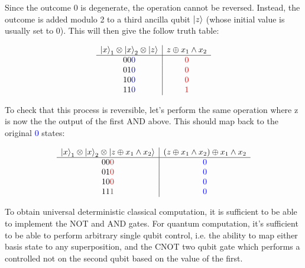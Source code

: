 Since the outcome 0 is degenerate, the operation cannot be reversed. Instead, the outcome is added modulo 2 to a third ancilla qubit $\left\vert{z}\right\rangle$ (whose initial value is usually set to 0). This will then give the follow truth table:

\begin{equation}
\begin{array}{c|c}
    \left\vert{x}\right\rangle_1 \otimes \left\vert{x}\right\rangle_2 \otimes \left\vert{z}\right\rangle & z \oplus x_1\wedge x_2 \\
    \hline
    00\textcolor{blue}{0} & \textcolor{red}{0} \\
    01\textcolor{blue}{0} & \textcolor{red}{0} \\
    10\textcolor{blue}{0} & \textcolor{red}{0} \\
    11\textcolor{blue}{0} & \textcolor{red}{1} \\
\end{array}
\end{equation}

To check that this process is reversible, let's perform the same operation where z is now the the output of the first AND above. This should map back to the original \textcolor{blue}{0} states:

\begin{equation}
\begin{array}{c|c}
    \left\vert{x}\right\rangle_1 \otimes \left\vert{x}\right\rangle_2 \otimes \left\vert{z \oplus x_1\wedge x_2}\right\rangle & (z \oplus x_1\wedge x_2) \oplus x_1\wedge x_2 \\
    \hline
    00\textcolor{red}{0} & \textcolor{blue}{0} \\
    01\textcolor{red}{0} & \textcolor{blue}{0} \\
    10\textcolor{red}{0} & \textcolor{blue}{0} \\
    11\textcolor{red}{1} & \textcolor{blue}{0} \\
\end{array}
\end{equation}

To obtain universal deterministic classical computation, it is sufficient to be able to implement the NOT and AND gates. For quantum computation, it's sufficient to be able to perform arbitrary single qubit control, i.e. the ability to map either basis state to any superposition, and the CNOT two qubit gate which performs a controlled not on the second qubit based on the value of the first.

